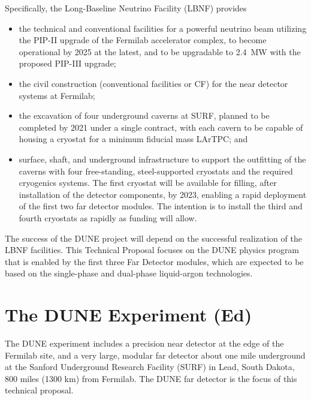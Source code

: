 Specifically, the Long-Baseline Neutrino Facility (LBNF) provides
\begin{itemize}

\item  the  technical and conventional facilities for a powerful  neutrino beam utilizing the PIP-II upgrade of the Fermilab accelerator 
complex, to become operational by 2025 
at the latest, and to be upgradable to \SI{2.4}{\MW} with the proposed 
PIP-III upgrade;

\item  the civil construction (conventional facilities or CF) for the near detector systems at Fermilab; 

\item the excavation of four underground caverns at SURF, planned to be completed 
by 2021 
under a single contract, with each cavern to be capable of housing a cryostat for
a minimum  fiducial mass LArTPC; and


\item surface, shaft, and underground infrastructure to support 
the outfitting of the caverns with four free-standing, steel-supported cryostats 
and the required cryogenics systems. The first cryostat will be available for filling, after installation of the detector components, by
2023, enabling a rapid deployment of the first two  far detector modules. 
The intention is to install the third and fourth cryostats as rapidly as funding will 
allow.

\end{itemize}
The success of the DUNE project will depend on the successful realization of the LBNF facilities.
This Technical Proposal focuses on the DUNE physics program that is enabled by
the first three Far Detector modules, which are expected to be based on the single-phase and dual-phase liquid-argon technologies. 

\section{The DUNE Experiment (Ed)}


The DUNE experiment includes a precision near detector at the edge of the Fermilab site, and a very large, modular far detector about one mile underground at the Sanford Underground Research Facility (SURF) in Lead, South Dakota, 800 miles (1300 km) from Fermilab. The DUNE far detector is the focus of this technical proposal. 

